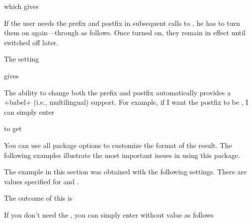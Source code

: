 \documentclass[a4paper,11pt,final]{article}
\def\ie{i.e.\xspace}
\def\ie{i.e.\xspace}
\begin{document}
which gives

\small
{}
\normalsize

\bigskip
If the user needs the prefix and postfix in subsequent calls to \cmda{\getfiledate}, he has to turn them on again---through  as follows. Once turned on, they remain in effect until switched off later.

The setting
\begin{gfdverbatim}
\end{gfdverbatim}

gives

\small
{}
\normalsize

\bigskip
The ability to change both the prefix and postfix automatically provides a +babel+ (\ie, multilingual) support. For example, if I want the postfix to be \cmdb{\mrule}, I can simply enter

\begin{gfdverbatim}
\new\def\mrule{\rule[.2ex]{.5cm}{3pt}}
\end{gfdverbatim}

to get

\new\def\mrule{\rule[.2ex]{.5cm}{3pt}}
\small
{}
\normalsize

\bigskip
You can use all package options to customize the format of the result. The following examples illustrate the most important issues in using this package.

\gfdexample
The example in this section was obtained with the following settings. There are values specified for  and .
\begin{gfdverbatim}
\end{gfdverbatim}

The outcome of this is
\small
{}
\normalsize

If you don't need the , you can simply enter  without value as follows
\end{document}
